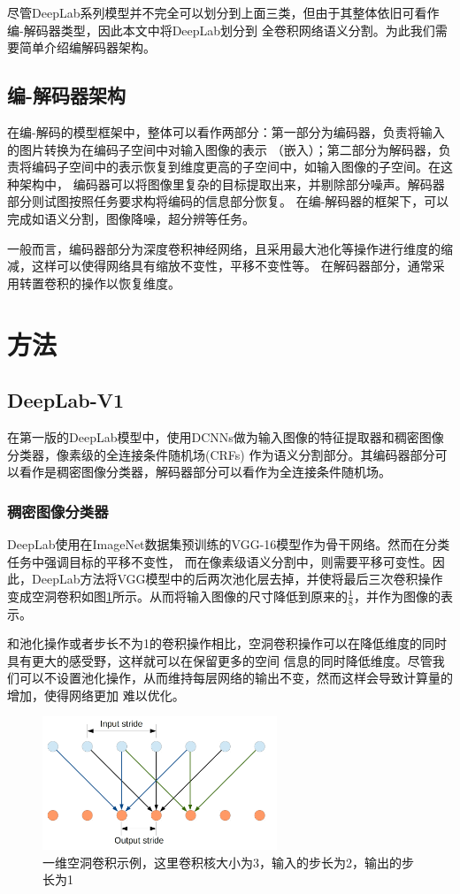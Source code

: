 \documentclass[10pt, a4paper]{article}
\begin{document}
尽管DeepLab系列模型并不完全可以划分到上面三类，但由于其整体依旧可看作编-解码器类型，因此本文中将DeepLab划分到
全卷积网络语义分割。为此我们需要简单介绍编解码器架构。

\subsection{编-解码器架构}
在编-解码的模型框架中，整体可以看作两部分：第一部分为编码器，负责将输入的图片转换为在编码子空间中对输入图像的表示
（嵌入）；第二部分为解码器，负责将编码子空间中的表示恢复到维度更高的子空间中，如输入图像的子空间。在这种架构中，
编码器可以将图像里复杂的目标提取出来，并剔除部分噪声。解码器部分则试图按照任务要求构将编码的信息部分恢复。
在编-解码器的框架下，可以完成如语义分割，图像降噪，超分辨等任务。

一般而言，编码器部分为深度卷积神经网络，且采用最大池化等操作进行维度的缩减，这样可以使得网络具有缩放不变性，平移不变性等。
在解码器部分，通常采用转置卷积的操作以恢复维度。

\section{方法}
\subsection{DeepLab-V1}
在第一版的DeepLab模型中，使用DCNNs做为输入图像的特征提取器和稠密图像分类器，像素级的全连接条件随机场(CRFs)\cite{CRF}
作为语义分割部分。其编码器部分可以看作是稠密图像分类器，解码器部分可以看作为全连接条件随机场。

\subsubsection{稠密图像分类器}
DeepLab使用在ImageNet数据集预训练的VGG-16模型\cite{VGG}作为骨干网络。然而在分类任务中强调目标的平移不变性，
而在像素级语义分割中，则需要平移可变性。因此，DeepLab方法将VGG模型中的后两次池化层去掉，并使将最后三次卷积操作
变成空洞卷积如图\ref{p2}所示。从而将输入图像的尺寸降低到原来的$\frac{1}{8}$，并作为图像的表示。

和池化操作或者步长不为1的卷积操作相比，空洞卷积操作可以在降低维度的同时具有更大的感受野，这样就可以在保留更多的空间
信息的同时降低维度。尽管我们可以不设置池化操作，从而维持每层网络的输出不变，然而这样会导致计算量的增加，使得网络更加
难以优化。

\begin{figure}[htbp]
    \centering
    \includegraphics[width=7cm]{p2.png}
    \caption{一维空洞卷积示例，这里卷积核大小为3，输入的步长为2，输出的步长为1}
    \label{p2}
\end{figure}
\end{document}
